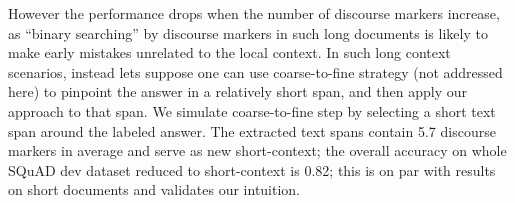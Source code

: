 However the performance drops when the number of discourse markers increase, as 
``binary searching'' by discourse markers in such long documents is likely to make early mistakes unrelated to the local context. In such long context scenarios, instead lets suppose one can use coarse-to-fine strategy (not addressed here) to pinpoint the answer in a relatively short span, and then apply our approach to that span. We simulate coarse-to-fine step by selecting a short text span around the labeled answer. The extracted text spans contain 5.7 discourse markers in average and serve as new short-context; the overall accuracy on whole SQuAD dev dataset reduced to short-context is 0.82; this is on par with results on short documents and validates our intuition. 